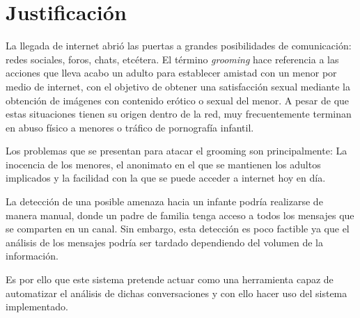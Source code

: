\section{Justificaci\'on}

La llegada de internet abrió las puertas a grandes posibilidades de comunicaci\'on: redes sociales, foros, chats, etc\'etera. El t\'ermino \textit{grooming} hace referencia a las acciones que lleva acabo un adulto para establecer amistad con un menor por medio de internet, con el objetivo de obtener una satisfacci\'on sexual mediante la obtenci\'on de im\'agenes con contenido er\'otico o sexual del menor. A pesar de que estas situaciones tienen su origen dentro de la red, muy frecuentemente terminan en abuso f\'isico a menores o tr\'afico de pornograf\'ia infantil.

Los problemas que se presentan para atacar el grooming son principalmente: La inocencia de los menores, el anonimato en el que se mantienen los adultos implicados y la facilidad con la que se puede acceder a internet hoy en d\'ia.

La detecci\'on de una posible amenaza hacia un infante podr\'ia realizarse de manera manual, donde un padre de familia tenga acceso a todos los mensajes que se comparten en un canal. Sin embargo, esta detecci\'on es poco factible ya que el an\'alisis de los mensajes podr\'ia ser tardado dependiendo del volumen de la  informaci\'on.

Es por ello que este sistema pretende actuar como una herramienta capaz de automatizar el an\'alisis de dichas conversaciones y con ello hacer uso del sistema implementado.